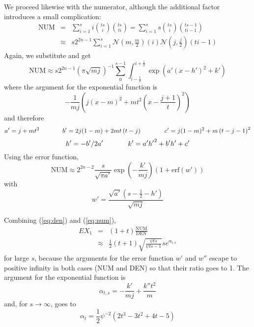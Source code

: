 \documentclass[11pt]{article}
\newcommand{\erf}[0]{\mbox{erf}}
\newcommand{\anum}[0]{a'}
\newcommand{\bnum}[0]{b'}
\newcommand{\cnum}[0]{c'}
\newcommand{\hnum}[0]{h'}
\newcommand{\knum}[0]{k'}
\newcommand{\wnum}[0]{w'}
\newcommand{\kden}[0]{k''}
\begin{document}
We proceed likewise with the numerator, although the additional factor
introduces a small complication:
  \begin{eqnarray*}
  \mbox{NUM}&=&\sum_{i=1}^{s}i\binom{ts}{i}\binom{ts}{ti}=\sum_{i=1}^{s}s\binom{ts}{i}\binom{ts-1}{ti-1}\\
&\approx&s2^{2n-1}\sum_{i=1}^{s}\mathcal{N}\left(m,\frac{m}{2}\right)(i)\mathcal{N}\left(j,\frac{j}{2}\right)(ti-1)
\end{eqnarray*}
Again, we substitute and get
\begin{displaymath}
  \mbox{NUM}\approx{}s2^{2n-1}\left(\pi\sqrt{mj}\right)^{-1}\sum_{0}^{s-1}\int_{i-\frac{1}{2}}^{i+\frac{1}{2}}\exp\left({\anum}(x-{\hnum})^{2}+{\knum}\right)
\end{displaymath}
where the argument for the exponential function is
\begin{displaymath}
  -\frac{1}{mj}\left(j(x-m)^{2}+mt^{2}\left(x-\frac{j+1}{t}\right)^{2}\right)
\end{displaymath}
and therefore
\begin{displaymath}
{\anum}=j+mt^{2}\hspace{.5in}
{\bnum}=2j(1-m)+2mt\left(t-j\right)\hspace{.5in}
{\cnum}=j(1-m)^{2}+m\left(t-j-1\right)^{2}
\end{displaymath}
\begin{displaymath}
{\hnum}=-{\bnum}/2{\anum}\hspace{.5in}
{\knum}={\anum}{\hnum}^{2}+{\bnum}{\hnum}+{\cnum}
\end{displaymath}
Using the error function, 
\begin{equation}
  \label{eq:num}
  \mbox{NUM}\approx{}2^{2n-2}\frac{s}{\sqrt{\pi{}{\anum}}}\exp\left(-\frac{{\knum}}{mj}\right)\left(1+\erf({\wnum})\right)
\end{equation}
with
\begin{displaymath}
  {\wnum}=\frac{\sqrt{{\anum}}\left(s-\frac{1}{2}-{\hnum}\right)}{\sqrt{mj}}
\end{displaymath}

Combining ({\ref{eq:den}}) and ({\ref{eq:num}}),
\begin{eqnarray*}
  EX_{1}&=&(1+t)\frac{\mbox{NUM}}{\mbox{DEN}}\\
&\approx&\frac{1}{2}(t+1)\sqrt{\frac{\psi{}ts}{\psi{}ts-1}}se^{\alpha_{t,s}}
\end{eqnarray*}
for large $s$, because the arguments for the error function $w'$ and
$w''$ escape to positive infinity in both cases (NUM and DEN) so that
their ratio goes to 1. The argument for the exponential function is
\begin{displaymath}
  \alpha_{t,s}=-\frac{{\knum}}{mj}+\frac{{\kden}t^{2}}{m}
\end{displaymath}
and, for $s\rightarrow\infty$, goes to
\begin{displaymath}
  \alpha_{t}=\frac{1}{2}\psi^{-2}(2t^{3}-3t^{2}+4t-5)
\end{displaymath}
\end{document}
